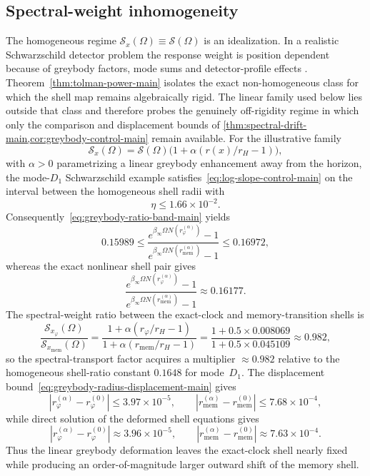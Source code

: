 \documentclass[11pt]{article}
\theoremstyle{definition}
\begin{document}
\subsection{Spectral-weight inhomogeneity}\label{subsec:nonhomogeneous}

The homogeneous regime $\mathcal S_x(\Omega)\equiv\mathcal S(\Omega)$ is an idealization. In a realistic Schwarzschild detector problem the response weight is position dependent because of greybody factors, mode sums and detector-profile effects \cite{Page1976Emission,ArbeyCalzaPerez2025}. Theorem~\ref{thm:tolman-power-main} isolates the exact non-homogeneous class for which the shell map remains algebraically rigid. The linear family used below lies outside that class and therefore probes the genuinely off-rigidity regime in which only the comparison and displacement bounds of \cref{thm:spectral-drift-main,cor:greybody-control-main} remain available. For the illustrative family
\[
\mathcal S_x(\Omega)=\mathcal S(\Omega)\bigl(1+\alpha(r(x)/r_H-1)\bigr),
\]
with $\alpha>0$ parametrizing a linear greybody enhancement away from the horizon, the mode-$D_1$ Schwarzschild example satisfies~\eqref{eq:log-slope-control-main} on the interval between the homogeneous shell radii with
\[
\eta\le1.66\times10^{-2}.
\]
Consequently~\eqref{eq:greybody-ratio-band-main} yields
\[
0.15989
\le
\frac{e^{\beta_\infty\Omega N(r_\varphi^{(\alpha)})}-1}
     {e^{\beta_\infty\Omega N(r_{\mathrm{mem}}^{(\alpha)})}-1}
\le
0.16972,
\]
whereas the exact nonlinear shell pair gives
\[
\frac{e^{\beta_\infty\Omega N(r_\varphi^{(\alpha)})}-1}
     {e^{\beta_\infty\Omega N(r_{\mathrm{mem}}^{(\alpha)})}-1}
\approx0.16177.
\]
The spectral-weight ratio between the exact-clock and memory-transition shells is
\[
\frac{\mathcal S_{x_\varphi}(\Omega)}{\mathcal S_{x_{\mathrm{mem}}}(\Omega)}
=
\frac{1+\alpha(r_\varphi/r_H-1)}{1+\alpha(r_{\mathrm{mem}}/r_H-1)}
=
\frac{1+0.5\times0.008069}{1+0.5\times0.045109}
\approx0.982,
\]
so the spectral-transport factor acquires a multiplier $\approx0.982$ relative to the homogeneous shell-ratio constant $0.1648$ for mode~$D_1$. The displacement bound~\eqref{eq:greybody-radius-displacement-main} gives
\[
|r_\varphi^{(\alpha)}-r_\varphi^{(0)}|
\le
3.97\times10^{-5},
\qquad
|r_{\mathrm{mem}}^{(\alpha)}-r_{\mathrm{mem}}^{(0)}|
\le
7.68\times10^{-4},
\]
while direct solution of the deformed shell equations gives
\[
|r_\varphi^{(\alpha)}-r_\varphi^{(0)}|
\approx
3.96\times10^{-5},
\qquad
|r_{\mathrm{mem}}^{(\alpha)}-r_{\mathrm{mem}}^{(0)}|
\approx
7.63\times10^{-4}.
\]
Thus the linear greybody deformation leaves the exact-clock shell nearly fixed while producing an order-of-magnitude larger outward shift of the memory shell.
\end{document}
